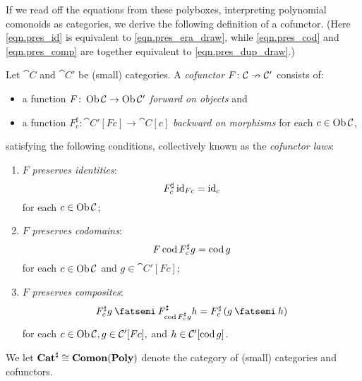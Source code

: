 \documentclass[Book-Poly]{subfiles}
\begin{document}
If we read off the equations from these polyboxes, interpreting polynomial comonoids as categories, we derive the following definition of a cofunctor.
(Here \eqref{eqn.pres_id} is equivalent to \eqref{eqn.pres_era_draw}, while \eqref{eqn.pres_cod} and \eqref{eqn.pres_comp} are together equivalent to \eqref{eqn.pres_dup_draw}.)

\begin{definition}[Cofunctor]\label{def.cofunctor}
Let $\cat{C}$ and $\cat{C'}$ be (small) categories.
A \emph{cofunctor} $F\colon\mathcal{C}\nrightarrow\mathcal{C'}$ consists of:
\begin{itemize}
    \item a function $F\colon\operatorname{Ob}\mathcal{C}\to\operatorname{Ob}\mathcal{C'}$ \emph{forward on objects} and
    \item a function $F^\sharp_c\colon\cat{C'}[Fc]\to\cat{C}[c]$ \emph{backward on morphisms} for each $c\in\operatorname{Ob}\mathcal{C}$,
\end{itemize}
satisfying the following conditions, collectively known as the \emph{cofunctor laws}:
\begin{enumerate}[itemsep=0pt, label=\roman*.]
	\item $F$ \emph{preserves identities}:
	\begin{equation} \label{eqn.pres_id}
	    F^\sharp_c\,\mathrm{id}_{Fc}=\mathrm{id}_c
	\end{equation}
	for each $c\in\operatorname{Ob}\mathcal{C}$;
	\item $F$ \emph{preserves codomains}:
	\begin{equation} \label{eqn.pres_cod}
	    F\operatorname{cod} F^\sharp_c g=\operatorname{cod} g
	\end{equation}
	for each $c\in\operatorname{Ob}\mathcal{C}$ and $g\in\cat{C'}[Fc]$;
	\item $F$ \emph{preserves composites}:%
	\begin{equation} \label{eqn.pres_comp}
	    F^\sharp_c g\then F^\sharp_{\cod F^\sharp_c g} h=F^\sharp_c\left(g\then h\right)
	\end{equation}
	for each $c\in\operatorname{Ob}\mathcal{C}, g\in\mathcal{C'}[Fc],$ and $h\in\mathcal{C'}[\operatorname{cod} g]$.
\end{enumerate}
We let $\mathbf{Cat}^\sharp\cong\mathbf{Comon}(\mathbf{Poly})$ denote the category of (small) categories and cofunctors.
\end{definition}
\end{document}
